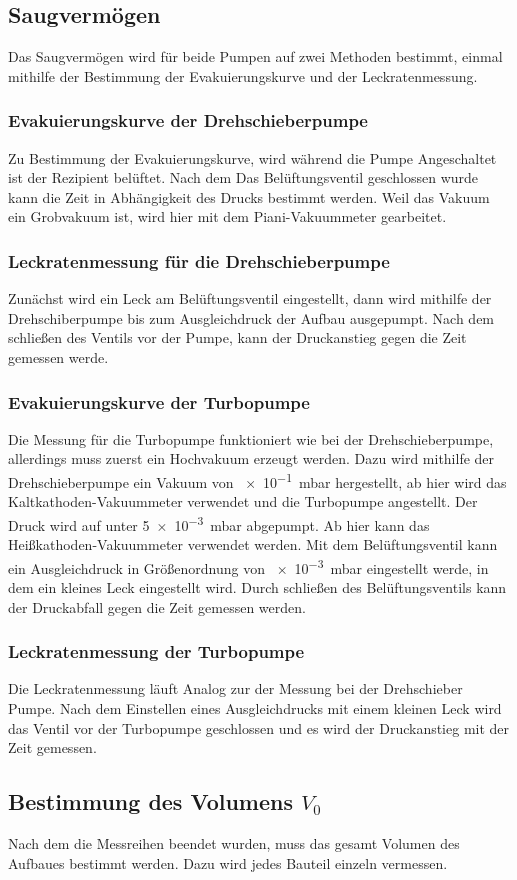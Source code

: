 \subsection{Saugvermögen}
Das Saugvermögen wird für beide Pumpen auf zwei Methoden bestimmt, einmal mithilfe der Bestimmung der Evakuierungskurve und der Leckratenmessung.
\subsubsection{Evakuierungskurve der Drehschieberpumpe}
Zu Bestimmung der Evakuierungskurve, wird während die Pumpe Angeschaltet ist der Rezipient belüftet. Nach dem Das Belüftungsventil geschlossen wurde kann die Zeit in Abhängigkeit des Drucks bestimmt werden. 
Weil das Vakuum ein Grobvakuum ist, wird hier mit dem Piani-Vakuummeter gearbeitet.
\subsubsection{Leckratenmessung für die Drehschieberpumpe}
Zunächst wird ein Leck am Belüftungsventil eingestellt, dann wird mithilfe der Drehschiberpumpe bis zum Ausgleichdruck der Aufbau ausgepumpt. Nach dem schließen des Ventils vor der Pumpe, kann der Druckanstieg gegen die Zeit gemessen werde. 
\subsubsection{Evakuierungskurve der Turbopumpe}
Die Messung für die Turbopumpe funktioniert wie bei der Drehschieberpumpe, allerdings muss zuerst ein Hochvakuum erzeugt werden. Dazu wird mithilfe der Drehschieberpumpe ein Vakuum von \SI{e-1}{\milli\bar} hergestellt, ab hier wird das Kaltkathoden-Vakuummeter verwendet und die Turbopumpe angestellt. Der Druck wird auf unter \SI{5e-3}{\milli\bar} abgepumpt. Ab hier kann das Heißkathoden-Vakuummeter verwendet werden. Mit dem Belüftungsventil kann ein Ausgleichdruck in Größenordnung von \SI{e-3}{\milli\bar} eingestellt werde, in dem ein kleines Leck eingestellt wird. Durch schließen des Belüftungsventils kann der Druckabfall gegen die Zeit gemessen werden.
\subsubsection{Leckratenmessung der Turbopumpe}
Die Leckratenmessung läuft Analog zur der Messung bei der Drehschieber Pumpe. Nach dem Einstellen eines Ausgleichdrucks mit einem kleinen Leck wird das Ventil vor der Turbopumpe geschlossen und es wird der Druckanstieg mit der Zeit gemessen.
\subsection{Bestimmung des Volumens $V_0$}
Nach dem die Messreihen beendet wurden, muss das gesamt Volumen des Aufbaues bestimmt werden. Dazu wird jedes Bauteil einzeln vermessen.